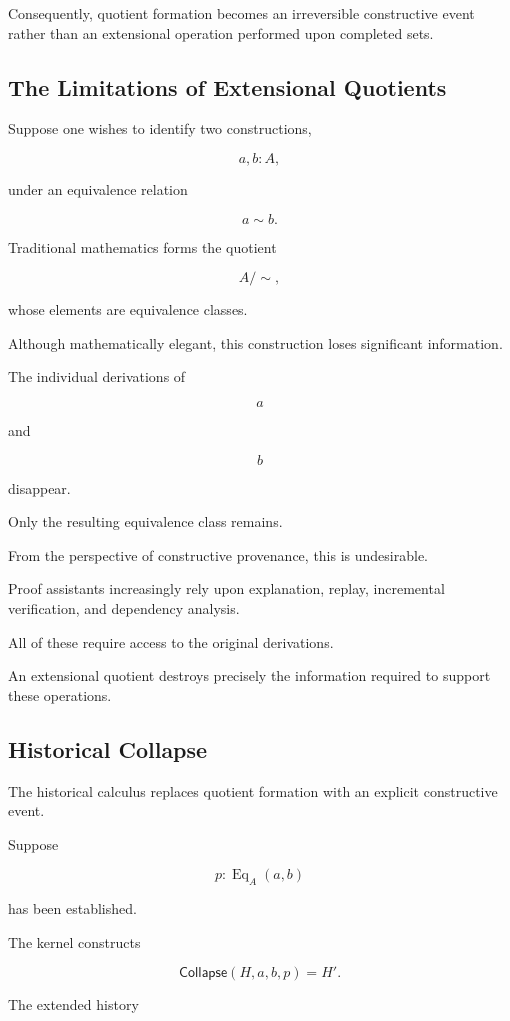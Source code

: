 \documentclass[12pt,oneside]{article}
\theoremstyle{definition}
\theoremstyle{remark}
\newcommand{\Collapse}{\mathsf{Collapse}}
\begin{document}
Consequently, quotient formation becomes an irreversible constructive event
rather than an extensional operation performed upon completed sets.

\subsection{The Limitations of Extensional Quotients}

Suppose one wishes to identify two constructions,

\[
a,b:A,
\]

under an equivalence relation

\[
a\sim b.
\]

Traditional mathematics forms the quotient

\[
A/{\sim},
\]

whose elements are equivalence classes.

Although mathematically elegant, this construction loses significant
information.

The individual derivations of

\[
a
\]

and

\[
b
\]

disappear.

Only the resulting equivalence class remains.

From the perspective of constructive provenance, this is undesirable.

Proof assistants increasingly rely upon explanation, replay,
incremental verification, and dependency analysis.

All of these require access to the original derivations.

An extensional quotient destroys precisely the information required to support
these operations.

\subsection{Historical Collapse}

The historical calculus replaces quotient formation with an explicit
constructive event.

Suppose

\[
p
:
\operatorname{Eq}_A(a,b)
\]

has been established.

The kernel constructs

\[
\Collapse(H,a,b,p)
=
H'.
\]

The extended history
\end{document}
